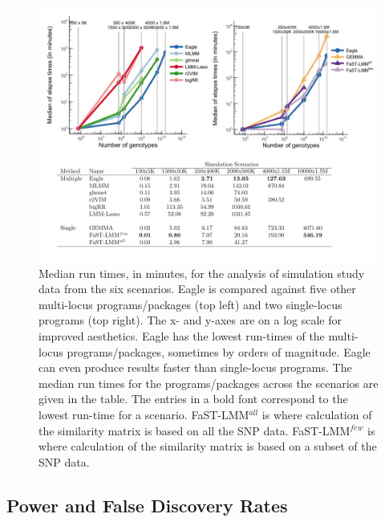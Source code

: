 \documentclass{nature}
\begin{document}
 
\begin{figure}
\caption{Median run times, in minutes, for the analysis of simulation study data from the six scenarios. 
Eagle is compared against five other multi-locus programs/packages (top left) and two single-locus programs (top right). 
The x- and y-axes are on a log scale for improved aesthetics. Eagle has the lowest run-times of the multi-locus 
programs/packages, sometimes by orders of magnitude. Eagle can even produce results faster than single-locus programs. 
The median run times for the programs/packages across the scenarios are given in the table. The entries in a bold font 
correspond to the lowest run-time for a scenario. 
 FaST-LMM$^{all}$ is where calculation of the similarity matrix is based on all the SNP data.  
 FaST-LMM$^{few}$ is where calculation  of the similarity matrix is based on a subset of the SNP data. }

\label{fig_time}
\centering
    \includegraphics[width=1.0\textwidth,natwidth=610,natheight=642]{Figure2_time.jpg}
\end{figure}

 



\subsection{Power and False Discovery Rates}
\end{document}
